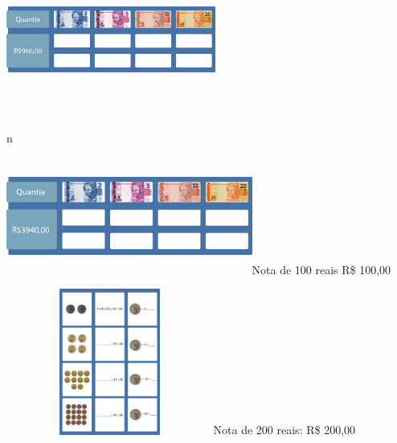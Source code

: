 \begin{multicols}{2}
{%

\includegraphics[width=2.71068in,height=1.97500in]{media/image69.png}%

n

\includegraphics[width=3.18285in,height=1.50833in]{media/image70.png}Nota
de 100 reais R\$ 100,00


\includegraphics[width=2.68333in,height=1.88913in]{media/image71.png}Nota
de 200 reais: R\$ 200,00
}


\end{multicols}
